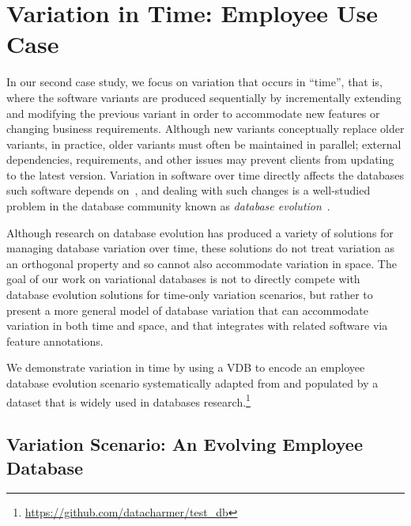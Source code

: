 \section{Variation in Time: Employee Use Case}
\label{sec:emp-vdb}



In our second case study, we focus on variation that occurs in ``time'', that
is, where the software variants are produced sequentially by incrementally
extending and modifying the previous variant in order to accommodate new
features or changing business requirements. Although new variants conceptually
replace older variants, in practice, older variants must often be maintained in
parallel; external dependencies, requirements, and other issues may prevent
clients from updating to the latest version.
%
Variation in software over time directly affects the databases such software
depends on~\cite{dbDecay16Stonebraker}, and dealing with such changes is a
well-studied problem in the database community known as \emph{database
evolution}~\cite{schVersioningSurvey95Roddick}.


Although research on database evolution has produced a variety of solutions for
managing database variation over time, these solutions do not treat variation
as an orthogonal property and so cannot also accommodate variation in space.
The goal of our work on variational databases is not to directly compete with
database evolution solutions for time-only variation scenarios, but rather to
present a more general model of database variation that can accommodate
variation in both time and space, and that integrates with related software via
feature annotations.

We demonstrate variation in time by 
using a VDB to encode an employee database evolution scenario
systematically adapted from
\citet{prima08Moon} and populated by a dataset that is widely used
in databases research.\footnote{\url{https://github.com/datacharmer/test_db}}


\subsection{Variation Scenario: An Evolving Employee Database}
\label{sec:emp-scenario}

